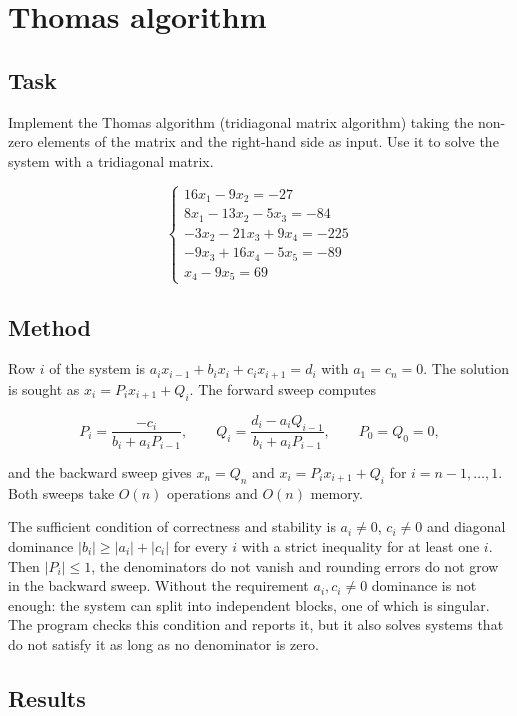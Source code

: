 \section{Thomas algorithm}

\subsection{Task}

Implement the Thomas algorithm (tridiagonal matrix algorithm) taking the non-zero elements of the
matrix and the right-hand side as input. Use it to solve the system with a tridiagonal matrix.

\[
\begin{cases}
16x_1 - 9x_2 = -27 \\
8x_1 - 13x_2 - 5x_3 = -84 \\
-3x_2 - 21x_3 + 9x_4 = -225 \\
-9x_3 + 16x_4 - 5x_5 = -89 \\
x_4 - 9x_5 = 69
\end{cases}
\]

\subsection{Method}

Row $i$ of the system is $a_i x_{i-1} + b_i x_i + c_i x_{i+1} = d_i$ with $a_1 = c_n = 0$.
The solution is sought as $x_i = P_i x_{i+1} + Q_i$. The forward sweep computes

\[
P_i = \frac{-c_i}{b_i + a_i P_{i-1}}, \qquad
Q_i = \frac{d_i - a_i Q_{i-1}}{b_i + a_i P_{i-1}}, \qquad
P_0 = Q_0 = 0,
\]

and the backward sweep gives $x_n = Q_n$ and $x_i = P_i x_{i+1} + Q_i$ for
$i = n - 1, \ldots, 1$. Both sweeps take $O(n)$ operations and $O(n)$ memory.

The sufficient condition of correctness and stability is $a_i \ne 0$, $c_i \ne 0$ and diagonal
dominance $|b_i| \ge |a_i| + |c_i|$ for every $i$ with a strict inequality for at least one $i$.
Then $|P_i| \le 1$, the denominators do not vanish and rounding errors do not grow in the
backward sweep. Without the requirement $a_i, c_i \ne 0$ dominance is not enough: the system can
split into independent blocks, one of which is singular. The program checks this condition and
reports it, but it also solves systems that do not satisfy it as long as no denominator is zero.

\subsection{Results}

